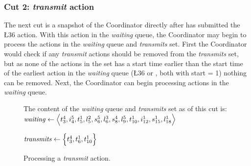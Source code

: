 \subsubsection{Cut 2: \textit{transmit} action}
The next cut is a snapshot of the Coordinator directly after  has submitted the \L{3}{6} action. With
this action in the \textit{waiting} queue, the Coordinator may begin to process the actions in the
\textit{waiting} queue and \textit{transmits} set. First the Coordinator would check if any \textit{transmit}
actions should be removed from the \textit{transmits} set, but as none of the actions in the set has a start
time earlier than the start time of the earliest action in the \textit{waiting} queue (\L{3}{6} or ,
both with start = 1) nothing can be removed. Next, the Coordinator can begin processing actions in the
\textit{waiting} queue. %

\begin{figure}[H]
    \caption{Processing a \textit{transmit} action.}\label{tikz:coordinatormsc2}
     \par

    \begin{minipage}[h]{14.5cm}
        The content of the \textit{waiting} queue and \textit{transmits} set as of this cut is: \smallbreak
        $\mathit{waiting} \leftarrow \Big\langle t^{4}_{3}, i^{5}_{4}, t^{1}_{5}, l^{2}_{5}, s^{5}_{6}, l^{3}_{6},
            s^{4}_{8}, l^{5}_{9}, t^{1}_{10}, i^{1}_{12}, s^{1}_{15}, l^{1}_{18} \Big\rangle$

        $\mathit{transmits} \leftarrow \Big\{ t^{4}_{3}, t^{1}_{6}, t^{1}_{10} \Big\}$
    \end{minipage}
\end{figure}

